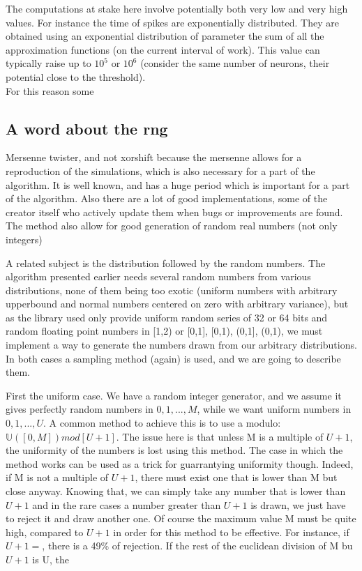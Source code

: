 	The computations at stake here involve potentially both very low and very high values. For instance the time of spikes are exponentially distributed. They are obtained using an exponential distribution of parameter the sum of all the approximation functions (on the current interval of work). This value can typically raise up to $10^5$ or $10^6$ (consider the same number of neurons, their potential close to the threshold).\\

	For this reason some 

\subsection{A word about the rng}
	Mersenne twister, and not xorshift because the mersenne allows for a reproduction of the simulations, which is also necessary for a part of the algorithm. It is well known, and has a huge period which is important for a part of the algorithm. Also there are a lot of good implementations, some of the creator itself who actively update them when bugs or improvements are found. The method also allow for good generation of random real numbers (not only integers)

	A related subject is the distribution followed by the random numbers. The algorithm presented earlier needs several random numbers from various distributions, none of them being too exotic (uniform numbers with arbitrary upperbound and normal numbers centered on zero with arbitrary variance), but as the library used only provide uniform random series of 32 or 64 bits and random floating point numbers in [1,2) or {[0,1], [0,1), (0,1], (0,1)}, we must implement a way to generate the numbers drawn from our arbitrary distributions. In both cases a sampling method (again) is used, and we are going to describe them.

	First the uniform case. We have a random integer generator, and we assume it gives perfectly random numbers in $ {0, 1, ..., M} $, while we want uniform numbers in $ {0, 1, ..., U} $. A common method to achieve this is to use a modulo: $ \mathbb{U}([0, M]) mod[U+1] $. The issue here is that unless M is a multiple of $ U+1 $, the uniformity of the numbers is lost using this method. The case in which the method works can be used as a trick for guarrantying uniformity though. Indeed, if M is not a multiple of $ U+1 $, there must exist one that is lower than M but close anyway. Knowing that, we can simply take any number that is lower than $ U+1 $ and in the rare cases a number greater than $ U+1 $ is drawn, we just have to reject it and draw another one. Of course the maximum value M must be quite high, compared to $ U+1 $ in order for this method to be effective. For instance, if $ U+1= $, there is a 49\% of rejection. If the rest of the euclidean division of M bu $ U+1 $ is U, the 